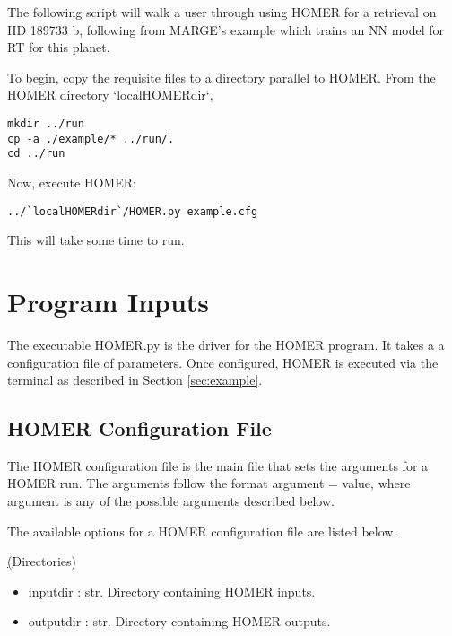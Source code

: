 \documentclass[letterpaper, 12pt]{article}
\begin{document}
The following script will walk a user through using HOMER for a retrieval on 
HD 189733 b, following from MARGE's example which trains an NN model for RT 
for this planet.

\noindent To begin, copy the requisite files to a directory parallel to HOMER.  From 
the HOMER directory `localHOMERdir`,

\begin{verbatim}
mkdir ../run
cp -a ./example/* ../run/.
cd ../run
\end{verbatim}

\noindent Now, execute HOMER:

\begin{verbatim}
../`localHOMERdir`/HOMER.py example.cfg
\end{verbatim}

\noindent This will take some time to run. 


\section{Program Inputs}
\label{sec:inputs}

The executable HOMER.py is the driver for the HOMER program. It takes a 
a configuration file of parameters.  Once configured, HOMER is executed via 
the terminal as described in Section \ref{sec:example}.


\subsection{HOMER Configuration File}
\label{sec:config}
The HOMER configuration file is the main file that sets the arguments for a 
HOMER run. The arguments follow the format {\ttb argument = value}, where 
{\ttb argument} is any of the possible arguments described below. 

\noindent The available options for a HOMER configuration file are listed below.

\noindent \underline(Directories)
\begin{itemize}
\item inputdir   : str.  Directory containing HOMER inputs.
\item outputdir  : str.  Directory containing HOMER outputs.
\end{itemize}
\end{document}
